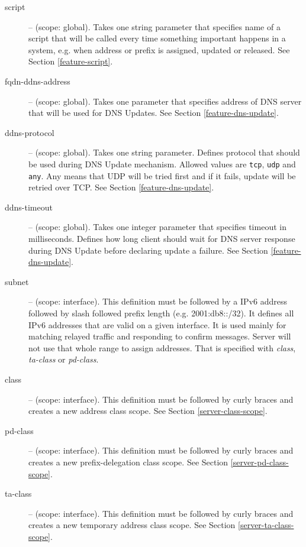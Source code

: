 \begin{description}
\item[script] -- (scope: global). Takes one string parameter that
  specifies name of a script that will be called every time something
  important happens in a system, e.g. when address or prefix is
  assigned, updated or released. See Section \ref{feature-script}.

\item[fqdn-ddns-address] -- (scope: global). Takes one parameter that
  specifies address of DNS server that will be used for DNS
  Updates. See Section \ref{feature-dns-update}.

\item[ddns-protocol] -- (scope: global). Takes one string
parameter. Defines protocol that should be used during DNS Update
mechanism. Allowed values are \verb+tcp+, \verb+udp+ and \verb+any+.
Any means that UDP will be tried first and if it fails, update will be
retried over TCP. See Section \ref{feature-dns-update}.

\item[ddns-timeout] -- (scope: global). Takes one integer parameter
that specifies timeout in milliseconds. Defines how long client should
wait for DNS server response during DNS Update before declaring
update a failure. See Section \ref{feature-dns-update}.

\item[subnet] -- (scope: interface). This definition must be followed
by a IPv6 address followed by slash followed prefix length
(e.g. 2001:db8::/32). It defines all IPv6 addresses that are valid on
a given interface. It is used mainly for matching relayed traffic and
responding to confirm messages. Server will not use that whole range
to assign addresses. That is specified with \emph{class}, \emph{ta-class}
or \emph{pd-class}.

\item[class] -- (scope: interface). This definition must be followed by
curly braces and creates a new address class scope. See
Section \ref{server-class-scope}.

\item[pd-class] -- (scope: interface). This definition must be
followed by curly braces and creates a new prefix-delegation class
scope. See Section \ref{server-pd-class-scope}.

\item[ta-class] -- (scope: interface). This definition must be
followed by curly braces and creates a new temporary address class
scope. See Section \ref{server-ta-class-scope}.


\end{description}
